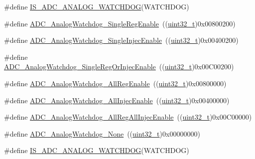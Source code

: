 \begin{DoxyCompactItemize}
\item 
\#define \hyperlink{group___a_d_c__analog__watchdog__selection_ga53ffa30f756569194342bfba80165544}{I\+S\+\_\+\+A\+D\+C\+\_\+\+A\+N\+A\+L\+O\+G\+\_\+\+W\+A\+T\+C\+H\+D\+OG}(W\+A\+T\+C\+H\+D\+OG)
\item 
\#define \hyperlink{group___a_d_c__analog__watchdog__selection_ga2975552a752f44085d9da54b4e76121e}{A\+D\+C\+\_\+\+Analog\+Watchdog\+\_\+\+Single\+Reg\+Enable}~((\hyperlink{_p_e___types_8h_a33594304e786b158f3fb30289278f5af}{uint32\+\_\+t})0x00800200)
\item 
\#define \hyperlink{group___a_d_c__analog__watchdog__selection_gaa9904271617ab69593ac68ae540047fb}{A\+D\+C\+\_\+\+Analog\+Watchdog\+\_\+\+Single\+Injec\+Enable}~((\hyperlink{_p_e___types_8h_a33594304e786b158f3fb30289278f5af}{uint32\+\_\+t})0x00400200)
\item 
\#define \hyperlink{group___a_d_c__analog__watchdog__selection_gaffd35fc6ceb226ec3fb61fb52227820c}{A\+D\+C\+\_\+\+Analog\+Watchdog\+\_\+\+Single\+Reg\+Or\+Injec\+Enable}~((\hyperlink{_p_e___types_8h_a33594304e786b158f3fb30289278f5af}{uint32\+\_\+t})0x00\+C00200)
\item 
\#define \hyperlink{group___a_d_c__analog__watchdog__selection_ga37f08e1a4a452a2c148341b3cfcdeb1e}{A\+D\+C\+\_\+\+Analog\+Watchdog\+\_\+\+All\+Reg\+Enable}~((\hyperlink{_p_e___types_8h_a33594304e786b158f3fb30289278f5af}{uint32\+\_\+t})0x00800000)
\item 
\#define \hyperlink{group___a_d_c__analog__watchdog__selection_gae4d6a7ebb136d924f0c8bad2cbac0574}{A\+D\+C\+\_\+\+Analog\+Watchdog\+\_\+\+All\+Injec\+Enable}~((\hyperlink{_p_e___types_8h_a33594304e786b158f3fb30289278f5af}{uint32\+\_\+t})0x00400000)
\item 
\#define \hyperlink{group___a_d_c__analog__watchdog__selection_ga25a299f4493aaae316521351198df084}{A\+D\+C\+\_\+\+Analog\+Watchdog\+\_\+\+All\+Reg\+All\+Injec\+Enable}~((\hyperlink{_p_e___types_8h_a33594304e786b158f3fb30289278f5af}{uint32\+\_\+t})0x00\+C00000)
\item 
\#define \hyperlink{group___a_d_c__analog__watchdog__selection_ga91f69979e0e449fef5a8b225a21e3eb9}{A\+D\+C\+\_\+\+Analog\+Watchdog\+\_\+\+None}~((\hyperlink{_p_e___types_8h_a33594304e786b158f3fb30289278f5af}{uint32\+\_\+t})0x00000000)
\item 
\#define \hyperlink{group___a_d_c__analog__watchdog__selection_ga53ffa30f756569194342bfba80165544}{I\+S\+\_\+\+A\+D\+C\+\_\+\+A\+N\+A\+L\+O\+G\+\_\+\+W\+A\+T\+C\+H\+D\+OG}(W\+A\+T\+C\+H\+D\+OG)
\end{DoxyCompactItemize}


